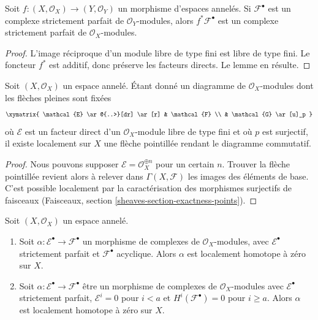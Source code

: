 {\begin{lemma}

\label{lemma-strictly-perfect-pullback}

Soit $f : (X, \mathcal{O}_X) \to (Y, \mathcal{O}_Y)$
un morphisme d'espaces annelés. Si $\mathcal{F}^\bullet$ est un complexe strictement parfait de $\mathcal{O}_Y$-modules, alors
$f^*\mathcal{F}^\bullet$ est un complexe strictement parfait de
$\mathcal{O}_X$-modules.

\end{lemma}

\begin{proof}

L'image réciproque d'un module libre de type fini est libre de type fini.
Le foncteur $f^*$ est additif, donc préserve les facteurs directs. Le lemme en résulte.

\end{proof}

\begin{lemma}

\label{lemma-local-lift-map}
Soit $(X, \mathcal{O}_X)$ un espace annelé. Étant donné un diagramme de $\mathcal{O}_X$-modules dont les flèches pleines sont fixées $$
\xymatrix{
\mathcal{E} \ar@{..>}[dr] \ar[r] & \mathcal{F} \\
& \mathcal{G} \ar[u]_p
}
$$ où $\mathcal{E}$ est un facteur direct d'un $\mathcal{O}_X$-module libre de type fini et où $p$ est surjectif, il existe localement sur $X$ une flèche pointillée rendant le diagramme commutatif.
\end{lemma}

\begin{proof}

Nous pouvons supposer $\mathcal{E} = \mathcal{O}_X^{\oplus n}$ pour un certain $n$. Trouver la flèche pointillée revient alors à relever dans $\Gamma(X, \mathcal{F})$ les images des éléments de base. C'est possible localement par la caractérisation des morphismes surjectifs de faisceaux (Faisceaux, section \ref{sheaves-section-exactness-points}).

\end{proof}

\begin{lemma}

\label{lemma-local-homotopy}

Soit $(X, \mathcal{O}_X)$ un espace annelé.

\begin{enumerate}

\item Soit $\alpha : \mathcal{E}^\bullet \to \mathcal{F}^\bullet$
un morphisme de complexes de $\mathcal{O}_X$-modules, avec $\mathcal{E}^\bullet$ strictement parfait et $\mathcal{F}^\bullet$
acyclique. Alors $\alpha$ est localement homotope à zéro sur $X$.
\item Soit $\alpha : \mathcal{E}^\bullet \to \mathcal{F}^\bullet$
être un morphisme de complexes de $\mathcal{O}_X$-modules avec $\mathcal{E}^\bullet$ strictement parfait, $\mathcal{E}^i = 0$
pour $i < a$ et $H^i(\mathcal{F}^\bullet) = 0$ pour $i \geq a$. Alors $\alpha$ est localement homotope à zéro sur $X$.


\end{enumerate}
\end{lemma}}
